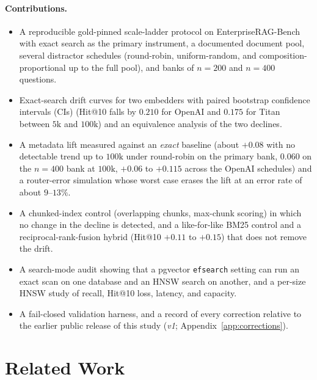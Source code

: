 \documentclass{ieeeaccess}
\makeatletter
\DeclareRobustCommand{\_}{\ifmmode\nfss@text{\textunderscore}\else\textunderscore\allowbreak\fi}
\makeatother
\begin{document}
\paragraph{Contributions.}
\begin{itemize}
\item A reproducible gold-pinned scale-ladder protocol on EnterpriseRAG-Bench~\cite{sun2026erb} with exact search as the primary instrument, a documented document pool, several distractor schedules (round-robin, uniform-random, and composition-proportional up to the full pool), and banks of $n{=}200$ and $n{=}400$ questions.
\item Exact-search drift curves for two embedders with paired bootstrap confidence intervals (CIs) (Hit@10 falls by $0.210$ for OpenAI and $0.175$ for Titan between $5\text{k}$ and $100\text{k}$) and an equivalence analysis of the two declines.
\item A metadata lift measured against an \emph{exact} baseline (about $+0.08$ with no detectable trend up to $100\text{k}$ under round-robin on the primary bank, $0.060$ on the $n{=}400$ bank at $100\text{k}$, $+0.06$ to $+0.115$ across the OpenAI schedules) and a router-error simulation whose worst case erases the lift at an error rate of about $9$--$13\%$.
\item A chunked-index control (overlapping chunks, max-chunk scoring) in which no change in the decline is detected, and a like-for-like BM25 control and a reciprocal-rank-fusion hybrid (Hit@10 $+0.11$ to $+0.15$) that does not remove the drift.
\item A search-mode audit showing that a pgvector \texttt{ef\_search} setting can run an exact scan on one database and an HNSW search on another, and a per-size HNSW study of recall, Hit@10 loss, latency, and capacity.
\item A fail-closed validation harness, and a record of every correction relative to the earlier public release of this study (\emph{v1}; Appendix~\ref{app:corrections}).
\end{itemize}

\section{Related Work}
\label{sec:related}
\end{document}
